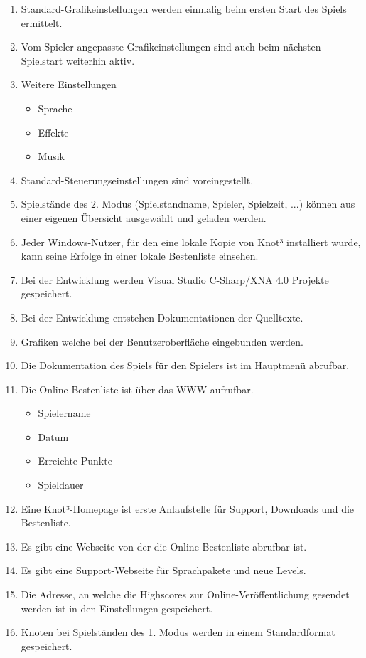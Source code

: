 \begin{enumerate}
\item Standard-Grafikeinstellungen werden einmalig beim ersten Start des Spiels ermittelt.
\item Vom Spieler angepasste Grafikeinstellungen sind auch beim nächsten Spielstart weiterhin aktiv.
\item Weitere Einstellungen

  \begin{itemize}
     \item Sprache
     \item Effekte
     \item Musik
  \end{itemize}

\item Standard-Steuerungseinstellungen sind voreingestellt.
\item Spielstände des 2. Modus (Spielstandname, Spieler, Spielzeit, ...) können aus einer eigenen Übersicht ausgewählt und geladen werden.
\item Jeder Windows-Nutzer, für den eine lokale Kopie von Knot³ installiert wurde, kann seine Erfolge in einer lokale Bestenliste einsehen.
\item Bei der Entwicklung werden Visual Studio C-Sharp/XNA 4.0 Projekte gespeichert.
\item Bei der Entwicklung entstehen Dokumentationen der Quelltexte.
\item Grafiken welche bei der Benutzeroberfläche eingebunden werden.
\item Die Dokumentation des Spiels für den Spielers ist im Hauptmenü abrufbar.
\item Die Online-Bestenliste ist über das WWW aufrufbar.

  \begin{itemize}
     \item Spielername
     \item Datum
     \item Erreichte Punkte
     \item Spieldauer
  \end{itemize}
  
\item Eine Knot³-Homepage ist erste Anlaufstelle für Support, Downloads und die Bestenliste.
\item Es gibt eine Webseite von der die Online-Bestenliste abrufbar ist.
\item Es gibt eine Support-Webseite für Sprachpakete und neue Levels.
\item Die Adresse, an welche die Highscores zur Online-Veröffentlichung gesendet werden ist in den Einstellungen gespeichert.
\item Knoten bei Spielständen des 1. Modus werden in einem Standardformat gespeichert.


\end{enumerate}
